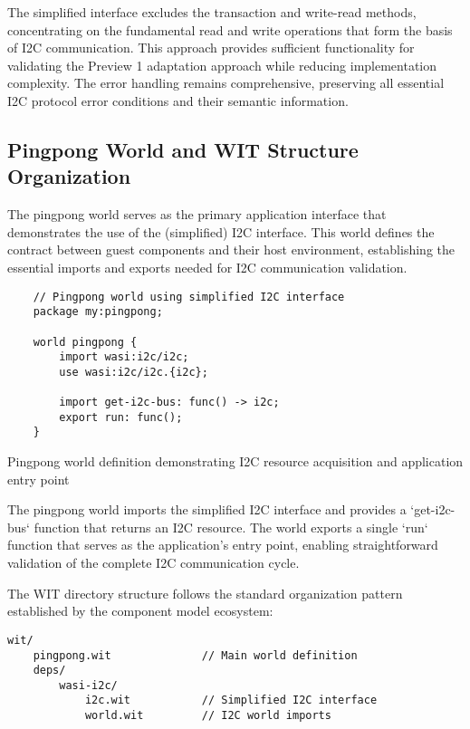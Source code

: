 The simplified interface excludes the transaction and write-read methods, concentrating on the fundamental read and write operations that form the basis of I2C communication. This approach provides sufficient functionality for validating the Preview 1 adaptation approach while reducing implementation complexity. The error handling remains comprehensive, preserving all essential I2C protocol error conditions and their semantic information.

\subsection{Pingpong World and WIT Structure Organization}

The pingpong world serves as the primary application interface that demonstrates the use of the (simplified) I2C interface. This world defines the contract between guest components and their host environment, establishing the essential imports and exports needed for I2C communication validation.

\begin{listing}[H]
    \begin{verbatim}
    // Pingpong world using simplified I2C interface
    package my:pingpong;
    
    world pingpong {
        import wasi:i2c/i2c;
        use wasi:i2c/i2c.{i2c};
    
        import get-i2c-bus: func() -> i2c;
        export run: func();
    }
    \end{verbatim}
    \caption{Pingpong world definition demonstrating I2C resource acquisition and application entry point}
    \label{lst:pingpong-world}
\end{listing}

The pingpong world imports the simplified I2C interface and provides a `get-i2c-bus` function that returns an I2C resource. The world exports a single `run` function that serves as the application's entry point, enabling straightforward validation of the complete I2C communication cycle.

The WIT directory structure follows the standard organization pattern established by the component model ecosystem:

\begin{verbatim}
wit/
    pingpong.wit              // Main world definition
    deps/
        wasi-i2c/
            i2c.wit           // Simplified I2C interface
            world.wit         // I2C world imports
\end{verbatim}

